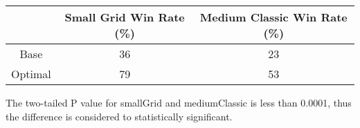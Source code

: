 \documentclass[12pt]{report}
\begin{document}
  \begin{table}[H]
    \begin{center}
      \begin{adjustbox}{max width=\textwidth}
      \begin{tabular}{*{3}{c}}
        \textbf{} & \textbf{Small Grid Win Rate (\%)} & \textbf{Medium Classic Win Rate (\%)} \\
        \hline
              Base & 36 & 23 \\
              Optimal & 79 & 53 \\

      \end{tabular}
      \end{adjustbox}
    \end{center}
  \end{table}
  \vspace{-9mm}
  The two-tailed P value for smallGrid and mediumClassic is less than 0.0001, thus the difference is considered to statistically significant.
\end{document}
